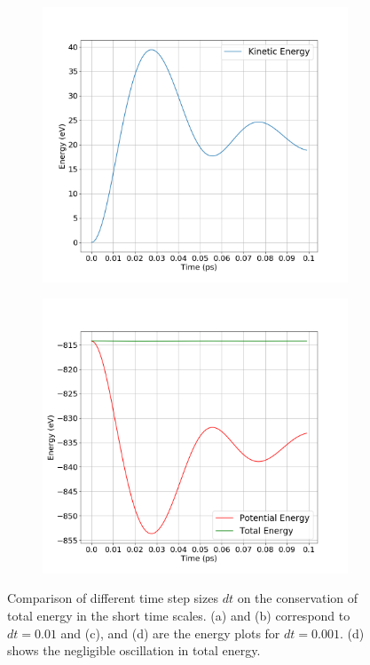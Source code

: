 \begin{figure}[!htbp]
\begin{center}
\begin{subfigure}[b]{0.5\textwidth}
			\caption{}
		\end{subfigure}
		\begin{subfigure}[b]{0.5\textwidth}
			\includegraphics[width=\textwidth]{figs/k-dt=0.001.png} 
			\caption{}
		\end{subfigure}%
		\begin{subfigure}[b]{0.5\textwidth}
			\includegraphics[width=\textwidth]{figs/e-p-dt=0.001.png} 
			\caption{}
		\end{subfigure}
	\caption{Comparison of different time step sizes $dt$ on the conservation of total energy in the short time scales. (a) and (b) correspond to $dt=0.01$ and (c), and (d) are the energy plots for $dt=0.001$. (d) shows the negligible oscillation in total energy.}
	\label{fig2-1}
	\end{center}
\end{figure}


